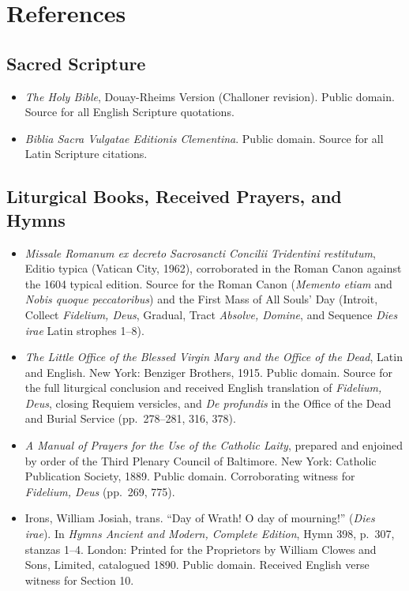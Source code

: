 \section{References}

\begingroup
\small
\ifdefined\TriptychPrintEdition
{}
\else
\fi
\subsection*{Sacred Scripture}

\begin{itemize}
\item \textit{The Holy Bible}, Douay-Rheims Version (Challoner revision). Public domain. Source for all English Scripture quotations.
\item \textit{Biblia Sacra Vulgatae Editionis Clementina}. Public domain. Source for all Latin Scripture citations.
\end{itemize}

\subsection*{Liturgical Books, Received Prayers, and Hymns}

\begin{itemize}
\item \textit{Missale Romanum ex decreto Sacrosancti Concilii Tridentini restitutum}, Editio typica (Vatican City, 1962), corroborated in the Roman Canon against the 1604 typical edition. Source for the Roman Canon (\textit{Memento etiam} and \textit{Nobis quoque peccatoribus}) and the First Mass of All Souls' Day (Introit, Collect \textit{Fidelium, Deus}, Gradual, Tract \textit{Absolve, Domine}, and Sequence \textit{Dies irae} Latin strophes 1--8).
\item \textit{The Little Office of the Blessed Virgin Mary and the Office of the Dead}, Latin and English. New York: Benziger Brothers, 1915. Public domain. Source for the full liturgical conclusion and received English translation of \textit{Fidelium, Deus}, closing Requiem versicles, and \textit{De profundis} in the Office of the Dead and Burial Service (pp.\ 278--281, 316, 378).
\item \textit{A Manual of Prayers for the Use of the Catholic Laity}, prepared and enjoined by order of the Third Plenary Council of Baltimore. New York: Catholic Publication Society, 1889. Public domain. Corroborating witness for \textit{Fidelium, Deus} (pp.\ 269, 775).
\item Irons, William Josiah, trans. ``Day of Wrath! O day of mourning!'' (\textit{Dies irae}). In \textit{Hymns Ancient and Modern, Complete Edition}, Hymn 398, p.\ 307, stanzas 1--4. London: Printed for the Proprietors by William Clowes and Sons, Limited, catalogued 1890. Public domain. Received English verse witness for Section 10.
\end{itemize}

